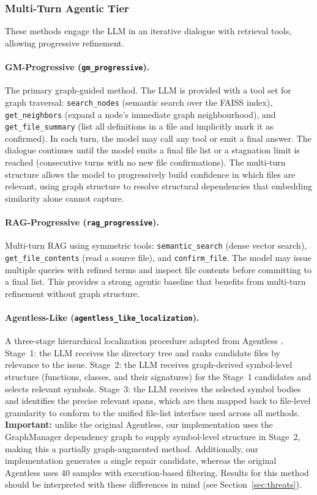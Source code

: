 \subsubsection{Multi-Turn Agentic Tier}
\label{sec:tier_multi}

These methods engage the LLM in an iterative dialogue with retrieval tools, allowing progressive refinement.

\paragraph{GM-Progressive (\texttt{gm\_progressive}).}
The primary graph-guided method. The LLM is provided with a tool set for graph traversal: \texttt{search\_nodes} (semantic search over the FAISS index), \texttt{get\_neighbors} (expand a node's immediate graph neighbourhood), and \texttt{get\_file\_summary} (list all definitions in a file and implicitly mark it as confirmed). In each turn, the model may call any tool or emit a final answer. The dialogue continues until the model emits a final file list or a stagnation limit is reached (consecutive turns with no new file confirmations). The multi-turn structure allows the model to progressively build confidence in which files are relevant, using graph structure to resolve structural dependencies that embedding similarity alone cannot capture.

\paragraph{RAG-Progressive (\texttt{rag\_progressive}).}
Multi-turn RAG using symmetric tools: \texttt{semantic\_search} (dense vector search), \texttt{get\_file\_contents} (read a source file), and \texttt{confirm\_file}. The model may issue multiple queries with refined terms and inspect file contents before committing to a final list. This provides a strong agentic baseline that benefits from multi-turn refinement without graph structure.

\paragraph{Agentless-Like (\texttt{agentless\_like\_localization}).}
A three-stage hierarchical localization procedure adapted from Agentless \citep{xia2024agentless}. Stage~1: the LLM receives the directory tree and ranks candidate files by relevance to the issue. Stage~2: the LLM receives graph-derived symbol-level structure (functions, classes, and their signatures) for the Stage~1 candidates and selects relevant symbols. Stage~3: the LLM receives the selected symbol bodies and identifies the precise relevant spans, which are then mapped back to file-level granularity to conform to the unified file-list interface used across all methods. \textbf{Important:} unlike the original Agentless, our implementation uses the GraphManager dependency graph to supply symbol-level structure in Stage~2, making this a partially graph-augmented method. Additionally, our implementation generates a single repair candidate, whereas the original Agentless uses 40 samples with execution-based filtering. Results for this method should be interpreted with these differences in mind (see Section~\ref{sec:threats}).

